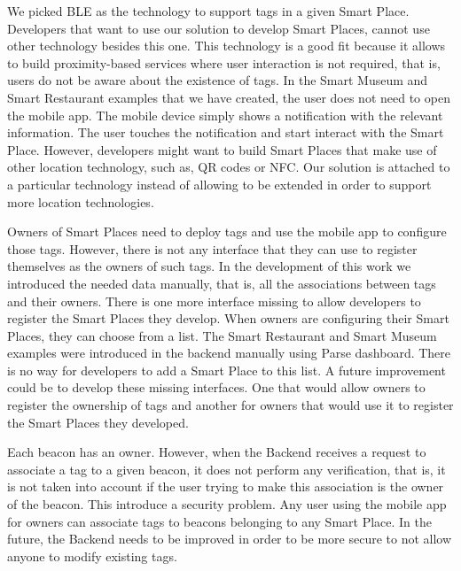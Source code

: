 We picked \gls{BLE} as the technology to support tags in a given Smart Place.
Developers that want to use our solution to develop Smart Places, cannot use other technology besides this one.
This technology is a good fit because it allows to build proximity-based services where user interaction is not required, that is, users do not be aware about the existence of tags.
In the Smart Museum and Smart Restaurant examples that we have created, the user does not need to open the mobile app.
The mobile device simply shows a notification with the relevant information. The user touches the notification and start interact with the Smart Place.
However, developers might want to build Smart Places that make use of other location technology, such as, \gls{QR} codes or \gls{NFC}.
Our solution is attached to a particular technology instead of allowing to be extended in order to support more location technologies.

Owners of Smart Places need to deploy tags and use the mobile app to configure those tags.
However, there is not any interface that they can use to register themselves as the owners of such tags.
In the development of this work we introduced the needed data manually, that is,
all the associations between tags and their owners.
There is one more interface missing to allow developers to register the Smart Places they develop.
When owners are configuring their Smart Places, they can choose from a list.
The Smart Restaurant and Smart Museum examples were introduced in the backend manually using Parse dashboard.
There is no way for developers to add a Smart Place to this list.
A future improvement could be to develop these missing interfaces.
One that would allow owners to register the ownership of tags and another for owners that would use it to register the Smart Places they developed.

Each beacon has an owner.
However, when the Backend receives a request to associate a tag to a given beacon, it does not perform any verification, that is, it is not taken into account if the user trying to make this association is the owner of the beacon.
This introduce a security problem. Any user using the mobile app for owners can associate tags to beacons belonging to any Smart Place.
In the future, the Backend needs to be improved in order to be more secure to not allow anyone to modify existing tags.

